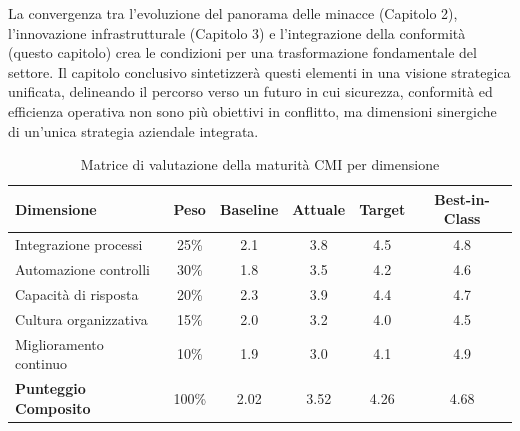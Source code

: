 La convergenza tra l'evoluzione del panorama delle minacce (Capitolo 2), l'innovazione infrastrutturale (Capitolo 3) e l'integrazione della conformità (questo capitolo) crea le condizioni per una trasformazione fondamentale del settore. Il capitolo conclusivo sintetizzerà questi elementi in una visione strategica unificata, delineando il percorso verso un futuro in cui sicurezza, conformità ed efficienza operativa non sono più obiettivi in conflitto, ma dimensioni sinergiche di un'unica strategia aziendale integrata.

\begin{table}[htbp]
\centering
\caption{Matrice di valutazione della maturità CMI per dimensione}
\label{tab:cmi_matrix}
\begin{tabular}{|l|c|c|c|c|c|}
\hline
\textbf{Dimensione} & \textbf{Peso} & \textbf{Baseline} & \textbf{Attuale} & \textbf{Target} & \textbf{Best-in-Class} \\
\hline
Integrazione processi & 25\% & 2.1 & 3.8 & 4.5 & 4.8 \\
Automazione controlli & 30\% & 1.8 & 3.5 & 4.2 & 4.6 \\
Capacità di risposta & 20\% & 2.3 & 3.9 & 4.4 & 4.7 \\
Cultura organizzativa & 15\% & 2.0 & 3.2 & 4.0 & 4.5 \\
Miglioramento continuo & 10\% & 1.9 & 3.0 & 4.1 & 4.9 \\
\hline
\textbf{Punteggio Composito} & 100\% & 2.02 & 3.52 & 4.26 & 4.68 \\
\hline
\end{tabular}
\end{table}

\printbibliography[
    heading=subbibliography,
]
\endrefsection %